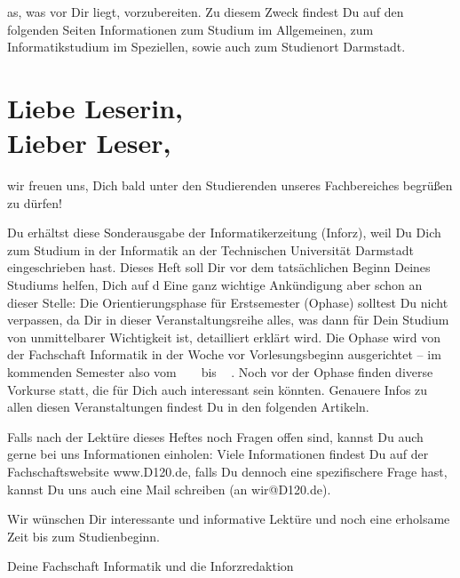 as, was vor Dir liegt, vorzubereiten. Zu diesem Zweck findest Du auf den folgenden Seiten Informationen zum Studium im Allgemeinen, zum Informatikstudium im Speziellen, sowie auch zum Studienort Darmstadt.
\section*{Liebe Leserin,\\ Lieber Leser,}

\vspace{1cm}
wir freuen uns, Dich bald unter den Studierenden unseres Fachbereiches begrüßen zu dürfen!

\vspace{0.5cm}
Du erhältst diese Sonderausgabe der Informatikerzeitung (Inforz), weil Du Dich zum Studium in der Informatik an der Technischen Universität Darmstadt eingeschrieben hast. Dieses Heft soll Dir vor dem tatsächlichen Beginn Deines Studiums helfen, Dich auf d
\vspace{0.5cm}
Eine ganz wichtige Ankündigung aber schon an dieser Stelle: Die Orientierungsphase für Erstsemester (Ophase) solltest Du nicht verpassen, da Dir in dieser Veranstaltungsreihe alles, was dann für Dein Studium von unmittelbarer Wichtigkeit ist, detailliert erklärt wird. Die Ophase wird von der Fachschaft Informatik in der Woche vor Vorlesungsbeginn ausgerichtet – im kommenden Semester also vom \ophaseAnfang ~ \the\year ~ bis \ophaseEnde ~ \the\year. Noch vor der Ophase finden diverse Vorkurse statt, die für Dich auch interessant sein könnten. Genauere Infos zu allen diesen Veranstaltungen findest Du in den folgenden Artikeln.

\vspace{0.5cm}
Falls nach der Lektüre dieses Heftes noch Fragen offen sind, kannst Du auch gerne bei uns Informationen einholen: Viele Informationen findest Du auf der Fachschaftswebsite www.D120.de, falls Du dennoch eine spezifischere Frage hast, kannst Du uns auch eine Mail schreiben (an wir@D120.de).

\vspace{0.5cm}
Wir wünschen Dir interessante und informative Lektüre und noch eine erholsame Zeit bis zum Studienbeginn.

\vspace{1cm}
Deine Fachschaft Informatik und die Inforzredaktion


\vfill



\newpage

